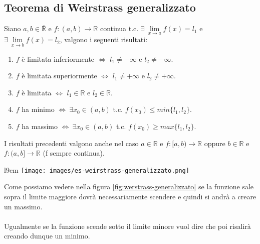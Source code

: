 \subsection{Teorema di Weirstrass generalizzato}
\begin{theorem}
Siano $a,b \in \overline{\mathbb{R}}$ e $f: (a,b) \to \mathbb{R}$ continua t.c. $\exists \: \lim\limits_{x \to a}f(x) = l_1$ e $\exists \: \lim\limits_{x \to b}f(x) = l_2$, valgono i seguenti risultati:
\begin{enumerate}
    \item $f$ è limitata inferiormente $\Longleftrightarrow$ $l_1 \neq -\infty$ e $l_2 \neq -\infty$.
    \item $f$ è limitata superiormente $\Longleftrightarrow$ $l_1 \neq +\infty$ e $l_2 \neq +\infty$.
    \item $f$ è limitata  $\Longleftrightarrow$ $l_1 \in \mathbb{R}$ e $l_2 \in \mathbb{R}$.
    \item $f$ ha minimo $\Longleftrightarrow \: \exists x_0 \in (a,b)$ t.c. $f(x_0) \leq min\{l_1, l_2\}$.
    \item $f$ ha massimo $\Longleftrightarrow \: \exists x_0 \in (a,b)$ t.c. $f(x_0) \geq max\{l_1, l_2\}$.
 \end{enumerate}
\end{theorem}
\begin{observation}
I risultati precedenti valgono anche nel caso $a \in \mathbb{R}$ e $f: [a,b) \to \mathbb{R}$ oppure $b\in \mathbb{R}$ e $f: (a,b] \to \mathbb{R}$ (f sempre continua).
\end{observation}
\begin{wrapfigure}[9]{l}{9cm}
    \vspace{-10pt}
    \centering
    \texttt{[image: images/es-weirstrass-generalizzato.png]}
    \vspace{-7pt}
    \caption{Massimi e minimi con Weirstrass}
    \label{fig:werstrass-generalizzato}
\end{wrapfigure}

Come possiamo vedere nella figura \ref{fig:werstrass-generalizzato} se la funzione sale sopra il limite maggiore dovrà necessariamente scendere e quindi si andrà a creare un massimo.\\\\
Ugualmente se la funzione scende sotto il limite minore vuol dire che poi risalirà creando dunque un minimo.\\\\\\

